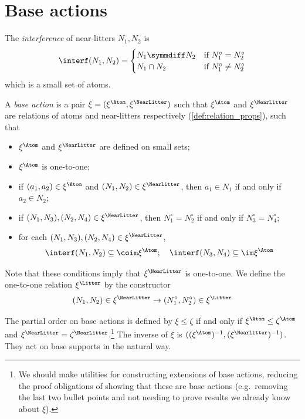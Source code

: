 \section{Base actions}
\begin{definition}
  \label{def:Interference}
  \leanok
  The \emph{interference} of near-litters \( N_1, N_2 \) is
  \[ \interf(N_1, N_2) = \begin{cases}
    N_1 \symmdiff N_2 & \text{if } N_1^\circ = N_2^\circ \\
    N_1 \cap N_2 & \text{if } N_1^\circ \neq N_2^\circ
  \end{cases} \]
  which is a small set of atoms.
\end{definition}
\begin{definition}
  \label{def:BaseAction}
  \leanok
  A \emph{base action} is a pair \( \xi = (\xi^\Atom, \xi^\NearLitter) \) such that \( \xi^\Atom \) and \( \xi^\NearLitter \) are relations of atoms and near-litters respectively (\cref{def:relation_props}), such that
  \begin{itemize}
    \item \( \xi^\Atom \) and \( \xi^\NearLitter \) are defined on small sets;
    \item \( \xi^\Atom \) is one-to-one;
    \item if \( (a_1, a_2) \in \xi^\Atom \) and \( (N_1, N_2) \in \xi^\NearLitter \), then \( a_1 \in N_1 \) if and only if \( a_2 \in N_2 \);
    \item if \( (N_1, N_3), (N_2, N_4) \in \xi^\NearLitter \), then \( N_1^\circ = N_2^\circ \) if and only if \( N_3^\circ = N_4^\circ \);
    \item for each \( (N_1, N_3), (N_2, N_4) \in \xi^\NearLitter \),
    \[ \interf(N_1, N_2) \subseteq \coim \xi^\Atom;\quad \interf(N_3, N_4) \subseteq \im \xi^\Atom \]
  \end{itemize}
  Note that these conditions imply that \( \xi^\NearLitter \) is one-to-one.
  We define the one-to-one relation \( \xi^\Litter \) by the constructor
  \[ (N_1, N_2) \in \xi^\NearLitter \to (N_1^\circ, N_2^\circ) \in \xi^\Litter \]

  The partial order on base actions is defined by \( \xi \leq \zeta \) if and only if \( \xi^\Atom \leq \zeta^\Atom \) and \( \xi^\NearLitter = \zeta^\NearLitter \).\footnote{We should make utilities for constructing extensions of base actions, reducing the proof obligations of showing that these are base actions (e.g.\ removing the last two bullet points and not needing to prove results we already know about \( \xi \)).}
  The inverse of \( \xi \) is \( ((\xi^\Atom)^{-1}, (\xi^\NearLitter)^{-1}) \).
  They act on base supports in the natural way.
\end{definition}
